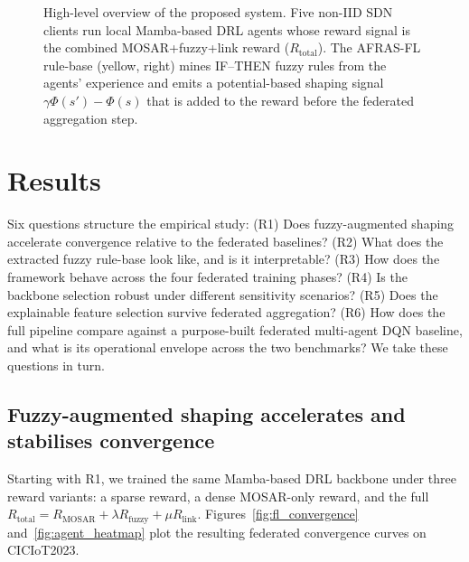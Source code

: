 \documentclass[ai,article,submit,moreauthors,pdftex]{Definitions/mdpi}
\begin{document}
\begin{figure}[!htbp]
{%
  }
  \caption{High-level overview of the proposed system. Five non-IID SDN
  clients run local Mamba-based DRL agents whose reward signal is the
  combined MOSAR+fuzzy+link reward
  ($R_{\text{total}}$). The AFRAS-FL rule-base (yellow, right) mines
  IF--THEN fuzzy rules from the agents' experience and emits a
  potential-based shaping signal $\gamma\Phi(s')-\Phi(s)$ that is added
  to the reward before the federated aggregation step.}
  \label{fig:system_overview}
\end{figure}

\section{Results}\label{sec:results}

Six questions structure the empirical study: (R1) Does
fuzzy-augmented shaping accelerate convergence relative to the
federated baselines? (R2) What does the extracted fuzzy rule-base
look like, and is it interpretable? (R3) How does the framework
behave across the four federated training phases? (R4) Is the
backbone selection robust under different sensitivity scenarios?
(R5) Does the explainable feature selection survive federated
aggregation? (R6) How does the full pipeline compare against a
purpose-built federated multi-agent DQN baseline, and what is its
operational envelope across the two benchmarks? We take these
questions in turn.

\subsection{Fuzzy-augmented shaping accelerates and stabilises
convergence}\label{sec:r1_convergence}

Starting with R1, we trained the same Mamba-based DRL
backbone\cite{gu2023mamba,gu2022efficiently} under three reward
variants: a sparse reward, a dense MOSAR-only reward, and the full
$R_{\text{total}} = R_{\text{MOSAR}} + \lambda R_{\text{fuzzy}} +
\mu R_{\text{link}}$. Figures~\ref{fig:fl_convergence}
and~\ref{fig:agent_heatmap} plot the resulting federated
convergence curves on CICIoT2023.
\end{document}
